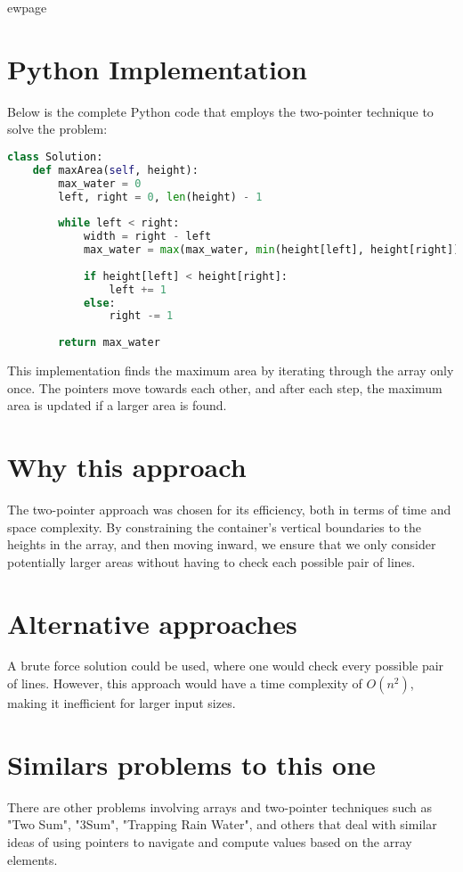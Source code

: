ewpage %
\section*{Python Implementation}
Below is the complete Python code that employs the two-pointer technique to solve the problem:

\begin{fullwidth}
\begin{lstlisting}[language=Python]
class Solution:
    def maxArea(self, height):
        max_water = 0
        left, right = 0, len(height) - 1
        
        while left < right:
            width = right - left
            max_water = max(max_water, min(height[left], height[right]) * width)
            
            if height[left] < height[right]:
                left += 1
            else:
                right -= 1
                
        return max_water
\end{lstlisting}

\end{fullwidth}

This implementation finds the maximum area by iterating through the array only once. The pointers move towards each other, and after each step, the maximum area is updated if a larger area is found.

\section*{Why this approach}
The two-pointer approach was chosen for its efficiency, both in terms of time and space complexity. By constraining the container's vertical boundaries to the heights in the array, and then moving inward, we ensure that we only consider potentially larger areas without having to check each possible pair of lines.

\section*{Alternative approaches}
A brute force solution could be used, where one would check every possible pair of lines. However, this approach would have a time complexity of \( O(n^2) \), making it inefficient for larger input sizes.

\section*{Similars problems to this one}
There are other problems involving arrays and two-pointer techniques such as "Two Sum", "3Sum", "Trapping Rain Water", and others that deal with similar ideas of using pointers to navigate and compute values based on the array elements.

